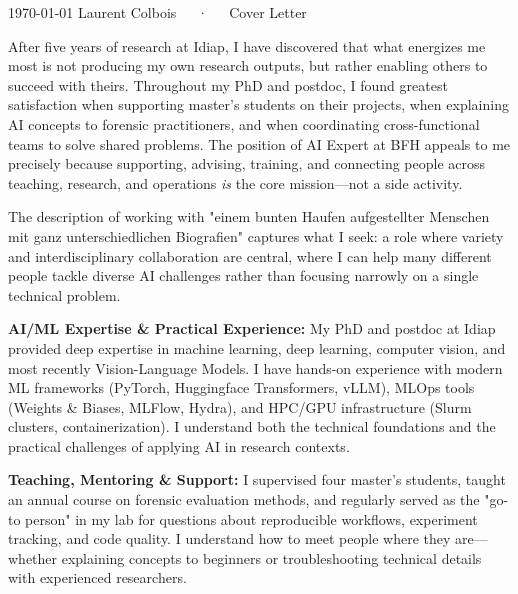 \documentclass[11pt, a4paper]{awesome-cv}
\begin{document}
\makecvheader[C]

\makecvfooter
  {\today}
  {Laurent Colbois~~~·~~~Cover Letter}
  {}

\makelettertitle

\begin{cvletter}

After five years of research at Idiap, I have discovered that what energizes me most is not producing my own research outputs, but rather enabling others to succeed with theirs. Throughout my PhD and postdoc, I found greatest satisfaction when supporting master's students on their projects, when explaining AI concepts to forensic practitioners, and when coordinating cross-functional teams to solve shared problems. The position of AI Expert at BFH appeals to me precisely because supporting, advising, training, and connecting people across teaching, research, and operations \textit{is} the core mission—not a side activity.

The description of working with "einem bunten Haufen aufgestellter Menschen mit ganz unterschiedlichen Biografien" captures what I seek: a role where variety and interdisciplinary collaboration are central, where I can help many different people tackle diverse AI challenges rather than focusing narrowly on a single technical problem.

\textbf{AI/ML Expertise \& Practical Experience:} My PhD and postdoc at Idiap provided deep expertise in machine learning, deep learning, computer vision, and most recently Vision-Language Models. I have hands-on experience with modern ML frameworks (PyTorch, Huggingface Transformers, vLLM), MLOps tools (Weights \& Biases, MLFlow, Hydra), and HPC/GPU infrastructure (Slurm clusters, containerization). I understand both the technical foundations and the practical challenges of applying AI in research contexts.

\textbf{Teaching, Mentoring \& Support:} I supervised four master's students, taught an annual course on forensic evaluation methods, and regularly served as the "go-to person" in my lab for questions about reproducible workflows, experiment tracking, and code quality. I understand how to meet people where they are—whether explaining concepts to beginners or troubleshooting technical details with experienced researchers.


\end{cvletter}
\end{document}
